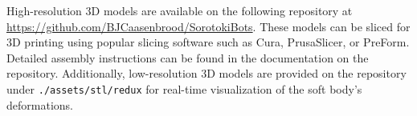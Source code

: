 \begin{rmk}
\normalfont
High-resolution 3D models are available on the following repository at \url{https://github.com/BJCaasenbrood/SorotokiBots}. These models can be sliced for 3D printing using popular slicing software such as Cura, PrusaSlicer, or PreForm. Detailed assembly instructions can be found in the documentation on the repository. Additionally, low-resolution 3D models are provided on the repository under \texttt{./assets/stl/redux} for real-time visualization of the soft body's deformations.
\end{rmk}

\vfill